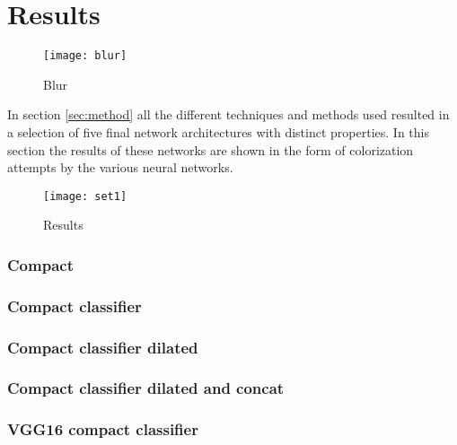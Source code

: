 \section{Results}\label{sec:results}
\begin{figure}[h]
	\centering
	\texttt{[image: blur]}
	\caption{Blur}
	\label{fig:blur}
\end{figure}

In section \ref{sec:method} all the different techniques and methods used resulted in a selection of five final network architectures with distinct properties. In this section the results of these networks are shown in the form of colorization attempts by the various neural networks. 

\begin{figure}[h]
	\centering
	\texttt{[image: set1]}
	\caption{Results}
	\label{fig:results}
\end{figure}


\subsubsection{Compact}



\subsubsection{Compact classifier}


\subsubsection{Compact classifier dilated}


\subsubsection{Compact classifier dilated and concat}


\subsubsection{VGG16 compact classifier}


